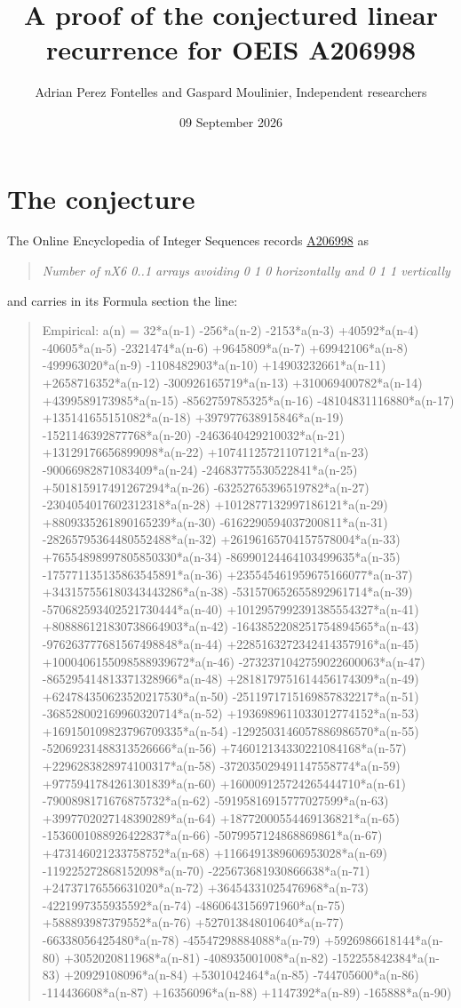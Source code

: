 \documentclass[11pt]{article}
\title{A proof of the conjectured linear recurrence for OEIS A206998}
\author{Adrian Perez Fontelles and Gaspard Moulinier, Independent researchers}
\date{09 September 2026}
\theoremstyle{definition}
\begin{document}
\maketitle
\section{The conjecture}

The Online Encyclopedia of Integer Sequences records \href{https://oeis.org/A206998}{A206998} as

\begin{quote}\itshape Number of nX6 0..1 arrays avoiding 0 1 0 horizontally and 0 1 1 vertically\end{quote}

and carries in its Formula section the line:

\begin{quote}\ttfamily Empirical: a(n) = 32*a(n-1) -256*a(n-2) -2153*a(n-3) +40592*a(n-4) -40605*a(n-5) -2321474*a(n-6) +9645809*a(n-7) +69942106*a(n-8) -499963020*a(n-9) -1108482903*a(n-10) +14903232661*a(n-11) +2658716352*a(n-12) -300926165719*a(n-13) +310069400782*a(n-14) +4399589173985*a(n-15) -8562759785325*a(n-16) -48104831116880*a(n-17) +135141655151082*a(n-18) +397977638915846*a(n-19) -1521146392877768*a(n-20) -2463640429210032*a(n-21) +13129176656899098*a(n-22) +10741125721107121*a(n-23) -90066982871083409*a(n-24) -24683775530522841*a(n-25) +501815917491267294*a(n-26) -63252765396519782*a(n-27) -2304054017602312318*a(n-28) +1012877132997186121*a(n-29) +8809335261890165239*a(n-30) -6162290594037200811*a(n-31) -28265795364480552488*a(n-32) +26196165704157578004*a(n-33) +76554898997805850330*a(n-34) -86990124464103499635*a(n-35) -175771135135863545891*a(n-36) +235545461959675166077*a(n-37) +343157556180343443286*a(n-38) -531570652655892961714*a(n-39) -570682593402521730444*a(n-40) +1012957992391385554327*a(n-41) +808886121830738664903*a(n-42) -1643852208251754894565*a(n-43) -976263777681567498848*a(n-44) +2285163272342414357916*a(n-45) +1000406155098588939672*a(n-46) -2732371042759022600063*a(n-47) -865295414813371328966*a(n-48) +2818179751614456174309*a(n-49) +624784350623520217530*a(n-50) -2511971715169857832217*a(n-51) -368528002169960320714*a(n-52) +1936989611033012774152*a(n-53) +169150109823796709335*a(n-54) -1292503146057886986570*a(n-55) -52069231488313526666*a(n-56) +746012134330221084168*a(n-57) +2296283828974100317*a(n-58) -372035029491147558774*a(n-59) +9775941784261301839*a(n-60) +160009125724265444710*a(n-61) -7900898171676875732*a(n-62) -59195816915777027599*a(n-63) +3997702027148390289*a(n-64) +18772000554469136821*a(n-65) -1536001088926422837*a(n-66) -5079957124868869861*a(n-67) +473146021233758752*a(n-68) +1166491389606953028*a(n-69) -119225272868152098*a(n-70) -225673681930866638*a(n-71) +24737176556631020*a(n-72) +36454331025476968*a(n-73) -4221997355935592*a(n-74) -4860643156971960*a(n-75) +588893987379552*a(n-76) +527013848010640*a(n-77) -66338056425480*a(n-78) -45547298884088*a(n-79) +5926986618144*a(n-80) +3052020811968*a(n-81) -408935001008*a(n-82) -152255842384*a(n-83) +20929108096*a(n-84) +5301042464*a(n-85) -744705600*a(n-86) -114436608*a(n-87) +16356096*a(n-88) +1147392*a(n-89) -165888*a(n-90)\end{quote}
\end{document}
